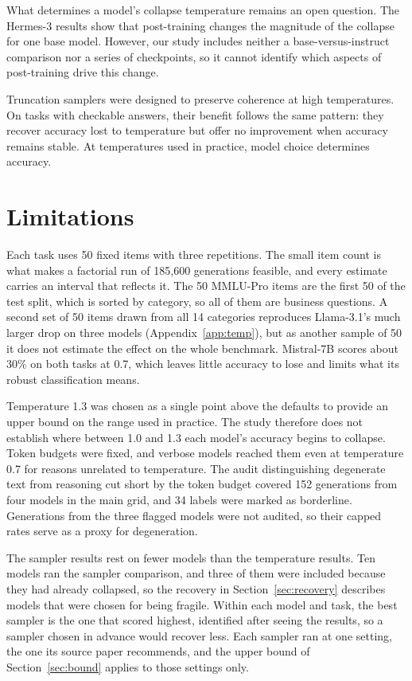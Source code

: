 \documentclass[11pt]{article}
\begin{document}
What determines a model's collapse temperature remains an open question. The Hermes-3 results
show that post-training changes the magnitude of the collapse for one base model. However, our
study includes neither a base-versus-instruct comparison nor a series of checkpoints, so it
cannot identify which aspects of post-training drive this change.

Truncation samplers were designed to preserve coherence at high temperatures. On tasks with
checkable answers, their benefit follows the same pattern: they recover accuracy lost to
temperature but offer no improvement when accuracy remains stable. At temperatures used in
practice, model choice determines accuracy.

\section*{Limitations}

Each task uses 50 fixed items with three repetitions. The small item count is what makes a
factorial run of 185,600 generations feasible, and every estimate carries an interval that
reflects it. The 50 MMLU-Pro items are the first 50 of the test split, which is sorted by
category, so all of them are business questions. A second set of 50 items drawn from all 14
categories reproduces Llama-3.1's much larger drop on three models (Appendix~\ref{app:temp}),
but as another sample of 50 it does not estimate the effect on the whole benchmark. Mistral-7B
scores about 30\% on both tasks at 0.7, which leaves little accuracy to lose and limits what its
robust classification means.

Temperature 1.3 was chosen as a single point above the defaults to provide an upper bound on
the range used in practice. The study therefore does not establish where between 1.0 and 1.3
each model's accuracy begins to collapse. Token budgets were fixed, and verbose models reached
them even at temperature 0.7 for reasons unrelated to temperature. The audit distinguishing
degenerate text from reasoning cut short by the token budget covered 152 generations from four
models in the main grid, and 34 labels were marked as borderline. Generations from the three
flagged models were not audited, so their capped rates serve as a proxy for degeneration.

The sampler results rest on fewer models than the temperature results. Ten models ran the
sampler comparison, and three of them were included because they had already collapsed, so the
recovery in Section~\ref{sec:recovery} describes models that were chosen for being fragile.
Within each model and task, the best sampler is the one that scored highest, identified after
seeing the results, so a sampler chosen in advance would recover less. Each sampler ran at one
setting, the one its source paper recommends, and the upper bound of Section~\ref{sec:bound}
applies to those settings only.
\end{document}
